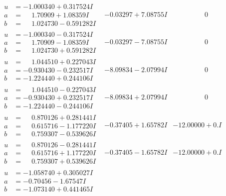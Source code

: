 \documentclass[1p]{elsarticle_modified}
\theoremstyle{definition}
\begin{document}
$$\begin{array}{c|c|c}
\begin{aligned}
u &= -1.000340 + 0.317524 I \\
a &= \phantom{-}1.70909 + 1.08359 I \\
b &= \phantom{-}1.024730 - 0.591282 I\end{aligned}
 & -0.03297 + 7.08755 I & \phantom{-0.000000 } 0 \\ \hline\begin{aligned}
u &= -1.000340 - 0.317524 I \\
a &= \phantom{-}1.70909 - 1.08359 I \\
b &= \phantom{-}1.024730 + 0.591282 I\end{aligned}
 & -0.03297 - 7.08755 I & \phantom{-0.000000 } 0 \\ \hline\begin{aligned}
u &= \phantom{-}1.044510 + 0.227043 I \\
a &= -0.930430 - 0.232517 I \\
b &= -1.224440 + 0.244106 I\end{aligned}
 & -8.09834 - 2.07994 I & \phantom{-0.000000 } 0 \\ \hline\begin{aligned}
u &= \phantom{-}1.044510 - 0.227043 I \\
a &= -0.930430 + 0.232517 I \\
b &= -1.224440 - 0.244106 I\end{aligned}
 & -8.09834 + 2.07994 I & \phantom{-0.000000 } 0 \\ \hline\begin{aligned}
u &= \phantom{-}0.870126 + 0.281441 I \\
a &= \phantom{-}0.615716 - 1.177220 I \\
b &= \phantom{-}0.759307 - 0.539626 I\end{aligned}
 & -0.37405 + 1.65782 I & -12.00000 + 0. I\phantom{ +0.000000I} \\ \hline\begin{aligned}
u &= \phantom{-}0.870126 - 0.281441 I \\
a &= \phantom{-}0.615716 + 1.177220 I \\
b &= \phantom{-}0.759307 + 0.539626 I\end{aligned}
 & -0.37405 - 1.65782 I & -12.00000 + 0. I\phantom{ +0.000000I} \\ \hline\begin{aligned}
u &= -1.058740 + 0.305027 I \\
a &= -0.70456 - 1.67547 I \\
b &= -1.073140 + 0.441465 I\end{aligned}

\end{array}$$
\end{document}
